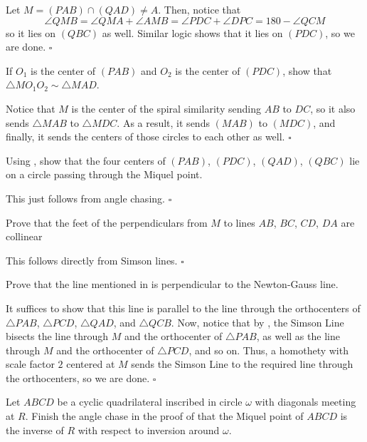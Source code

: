 \documentclass{article}
\begin{document}
Let $M = (PAB) \cap (QAD) \neq A$. Then, notice that \[\angle QMB = \angle QMA + \angle AMB = \angle PDC + \angle DPC = 180 - \angle QCM\] so it lies on $(QBC)$ as well. Similar logic shows that it lies on $(PDC)$, so we are done. $\square$

\begin{problem}[10.7]{}
If $O_1$ is the center of $(PAB)$ and $O_2$ is the center of $(PDC)$, show that $\triangle MO_1O_2 \sim \triangle MAD$. 
\end{problem}

Notice that $M$ is the center of the spiral similarity sending $AB$ to $DC$, so it also sends $\triangle MAB$ to $\triangle MDC$. As a result, it sends $(MAB)$ to $(MDC)$, and finally, it sends the centers of those circles to each other as well. $\square$

\begin{problem}[10.8]{}
Using , show that the four centers of $(PAB)$, $(PDC)$, $(QAD)$, $(QBC)$ lie on a circle passing through the Miquel point.
\end{problem}

This just follows from angle chasing. $\square$

\begin{problem}[10.10]{}
Prove that the feet of the perpendiculars from $M$ to lines $AB$, $BC$, $CD$, $DA$ are collinear
\end{problem}

This follows directly from Simson lines. $\square$

\begin{problem}[10.11]{}
Prove that the line mentioned in  is perpendicular to the Newton-Gauss line.
\end{problem}

It suffices to show that this line is parallel to the line through the orthocenters of $\triangle PAB$, $\triangle PCD$, $\triangle QAD$, and $\triangle QCB$. Now, notice that by , the Simson Line bisects the line through $M$ and the orthocenter of $\triangle PAB$, as well as the line through $M$ and the orthocenter of $\triangle PCD$, and so on. Thus, a homothety with scale factor $2$ centered at $M$ sends the Simson Line to the required line through the orthocenters, so we are done. $\square$

\begin{problem}[10.13]{}
Let $ABCD$ be a cyclic quadrilateral inscribed in circle $\omega$ with diagonals meeting at $R$. Finish the angle chase in the proof of that the Miquel point of $ABCD$ is the inverse of $R$ with respect to inversion around $\omega$.
\end{problem}
\end{document}
